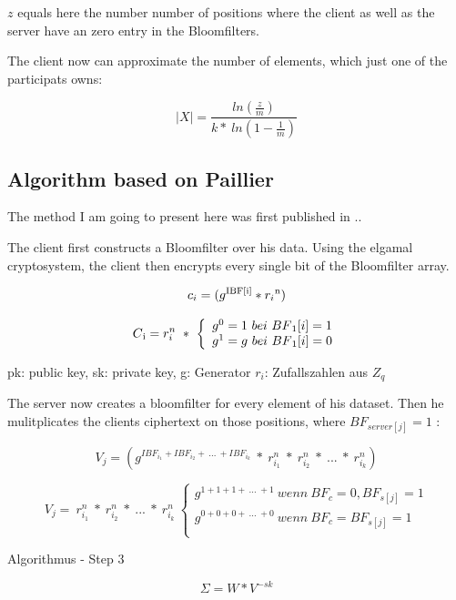 \documentclass[10pt,a4paper,oneside,twocolumn]{article}
\begin{document}
$ z $ equals here the number number of positions where the client as well as the server have an zero entry in the Bloomfilters.

The client now can approximate the number of elements, which just one of the participats owns: 

$$ |X| = \frac{ln( \frac{z}{m})}{k* \ ln(1- \frac{1}{m})}$$

\subsection{Algorithm based on Paillier}


The method I am going to present here was first published in .. 

The client first constructs a Bloomfilter over his data. 
Using the elgamal cryptosystem, the client then encrypts every single bit of the Bloomfilter array. 

$$c_i = (g \textsuperscript{IBF[i]}  * r_{i}\textsuperscript{n})$$
		
	\[
		C\textsubscript{i} = r_{i}^{n} \ * \ \left\{
		\begin{array}{ll}
		g^{0} = 1 \ bei \  BF\textsubscript{1}[i]=1\\
		g^{1} = g \ bei \ BF\textsubscript{1}[i]=0\\
		\end{array}
		\right.
		\]
		

			pk: public key, sk: private key, g: Generator $r_i$: Zufallszahlen aus $Z_q$ 

		

The server now creates a bloomfilter for every element of his dataset.
Then he mulitplicates the clients ciphertext on those positions, where $BF_{server[j]}= 1$ :	
		
$$ V_{j} = (g^{ IBF_{i_{1}} + IBF_{i_{2}} + \ ...\ +IBF_{i_{k}}} \ * \ r_{i_{1}}^{n} \ * \ r_{i_{2}}^{n} \ * \ ...\ * \  r_{i_{k}}^{n})$$
		
\[
V_{j} = \ r_{i_{1}}^{n} \ * \ r_{i_{2}}^{n} \ * \ ...\ * \  r_{i_{k}}^{n} \ \left\{
\begin{array}{ll}
g^{1 + 1 + 1 + \ ...\ +1} \ wenn \ BF_{c} = 0,BF_{s[j]} = 1 \\
g^{0 + 0 + 0 + \ ...\ +0} \ wenn \ BF_{c} = BF_{s[j]} = 1\\
\end{array}
\right.
\]
		
		
Algorithmus - Step 3


		$$\Sigma = W * V^{-sk}$$
		
\end{document}
